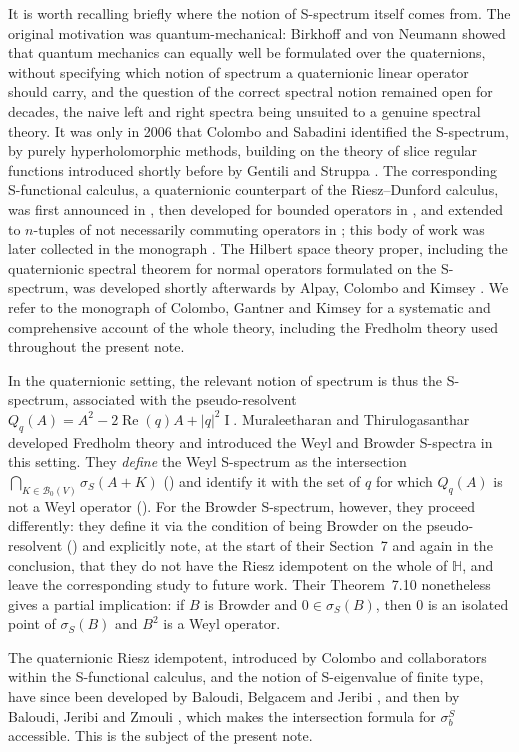 \documentclass[11pt,a4paper]{article}
\theoremstyle{plain}
\theoremstyle{remark}
\newcommand{\HH}{\mathbb H}
\newcommand{\V}{V}
\newcommand{\Bo}{\mathcal B_0}
\newcommand{\sS}{\sigma_S}
\newcommand{\sigb}{\sigma_b^S}
\DeclareMathOperator{\Id}{I}
\newcommand{\Qq}[1]{Q_q(#1)}
\begin{document}
It is worth recalling briefly where the notion of S-spectrum itself comes from. The original motivation was quantum-mechanical: Birkhoff and von Neumann \cite{BvN36} showed that quantum mechanics can equally well be formulated over the quaternions, without specifying which notion of spectrum a quaternionic linear operator should carry, and the question of the correct spectral notion remained open for decades, the naive left and right spectra being unsuited to a genuine spectral theory. It was only in 2006 that Colombo and Sabadini identified the S-spectrum, by purely hyperholomorphic methods, building on the theory of slice regular functions introduced shortly before by Gentili and Struppa \cite{GS07}. The corresponding S-functional calculus, a quaternionic counterpart of the Riesz--Dunford calculus, was first announced in \cite{CGSS07}, then developed for bounded operators in \cite{CS09,CGSS10}, and extended to $n$-tuples of not necessarily commuting operators in \cite{CSS08}; this body of work was later collected in the monograph \cite{CSS11}. The Hilbert space theory proper, including the quaternionic spectral theorem for normal operators formulated on the S-spectrum, was developed shortly afterwards by Alpay, Colombo and Kimsey \cite{ACK16}. We refer to the monograph of Colombo, Gantner and Kimsey \cite{CGK} for a systematic and comprehensive account of the whole theory, including the Fredholm theory used throughout the present note.

In the quaternionic setting, the relevant notion of spectrum is thus the S-spectrum, associated with the pseudo-resolvent $\Qq{A}=A^2-2\operatorname{Re}(q)A+|q|^2\Id$. Muraleetharan and Thirulogasanthar \cite{MT18,MT19} developed Fredholm theory and introduced the Weyl and Browder S-spectra in this setting. They \emph{define} the Weyl S-spectrum as the intersection $\bigcap_{K\in\Bo(\V)}\sS(A+K)$ (\cite[Def.~6.1]{MT19}) and identify it with the set of $q$ for which $\Qq{A}$ is not a Weyl operator (\cite[Thm~6.6]{MT19}). For the Browder S-spectrum, however, they proceed differently: they define it via the condition of being Browder on the pseudo-resolvent (\cite[Def.~7.12]{MT19}) and explicitly note, at the start of their Section~7 and again in the conclusion, that they do not have the Riesz idempotent on the whole of $\HH$, and leave the corresponding study to future work. Their Theorem~7.10 nonetheless gives a partial implication: if $B$ is Browder and $0\in\sS(B)$, then $0$ is an isolated point of $\sS(B)$ and $B^2$ is a Weyl operator.

The quaternionic Riesz idempotent, introduced by Colombo and collaborators \cite{CSS11,CGK} within the S-functional calculus, and the notion of S-eigenvalue of finite type, have since been developed by Baloudi, Belgacem and Jeribi \cite{BBJ22}, and then by Baloudi, Jeribi and Zmouli \cite{BJZ24}, which makes the intersection formula for $\sigb$ accessible. This is the subject of the present note.
\end{document}
